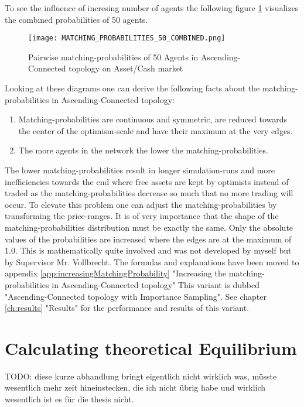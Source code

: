\documentclass[Bachelorarbeit.tex]{subfiles}
\begin{document}
To see the influence of incresing number of agents the following figure \ref{fig:MATCHING_PROBABILITIES_50_COMBINED} visualizes the combined probabilities of 50 agents.

\begin{figure}[H]
	\centering
  \texttt{[image: MATCHING\_PROBABILITIES\_50\_COMBINED.png]}
	\caption{Pairwise matching-probabilities of 50 Agents in Ascending-Connected topology on Asset/Cash market}
	\label{fig:MATCHING_PROBABILITIES_50_COMBINED}
\end{figure}

Looking at these diagrams one can derive the following facts about the matching-probabilities in Ascending-Connected topology:
\begin{enumerate}
\item Matching-probabilities are continuous and symmetric, are reduced towards the center of the optimism-scale and have their maximum at the very edges.
\item The more agents in the network the lower the matching-probabilities.
\end{enumerate}

The lower matching-probabilities result in longer simulation-runs and more inefficiencies towards the end where free assets are kept by optimists instead of traded as the matching-probabilities decrease so much that no more trading will occur. To elevate this problem one can adjust the matching-probabilities by transforming the price-ranges. It is of very importance that the shape of the matching-probabilities distribution must be exactly the same. Only the absolute values of the probabilities are increased where the edges are at the maximum of 1.0. This is mathematically quite involved and was not developed by myself but by Supervisor Mr. Vollbrecht. The formulas and explanations have been moved to appendix \ref{app:increasingMatchingProbability} "Increasing the matching-probabilities in Ascending-Connected topology"
\medskip
This variant is dubbed "Ascending-Connected topology with Importance Sampling". See chapter \ref{ch:results} "Results" for the performance and results of this variant.

\section{Calculating theoretical Equilibrium}
TODO: diese kurze abhandlung bringt eigentlich nicht wirklich was, müsste wesentlich mehr zeit hineinstecken, die ich nicht übrig habe und wirklich wesentlich ist es für die thesis nicht.
\end{document}
